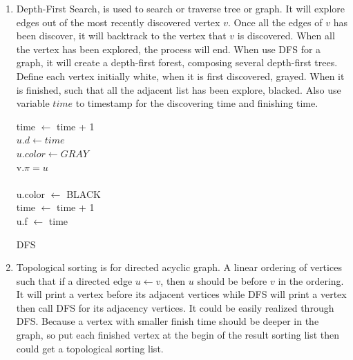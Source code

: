 \documentclass{assignment}
\begin{document}
    \maketitle

    \newpage
\begin{homeworkProblem}

\begin{enumerate}
\item Depth-First Search, is used to search or traverse tree or graph. It will explore edges out of the most recently discovered vertex $v$. Once all the edges of $v$ has been discover, it will backtrack to the vertex that $v$ is discovered. When all the vertex has been explored, the process will end. When use DFS for a graph, it will create a depth-first forest, composing several depth-first trees. Define each vertex initially white, when it is first discovered, grayed. When it is finished, such that all the adjacent list has been explore, blacked. Also use variable $time$ to timestamp for the discovering time and finishing time.


  \begin{algorithm}[H]
 \BlankLine
{}
 {
	time $\leftarrow$ time + 1 \\
	$u.d \leftarrow time$ \\
	$u.color \leftarrow GRAY$ \\
	 {
		 {
		v.$\pi = u$ \\
			 \\		
		}
	}
	u.color $\leftarrow$ BLACK \\
	time $\leftarrow$ time + 1\\
	u.f $\leftarrow$ time \\
}	
	
	
\caption{DFS} \end{algorithm}


\item Topological sorting is for directed acyclic graph. A linear ordering of vertices such that if a directed edge $u \leftarrow v$, then $u$ should be before $v$ in the ordering. It will print a vertex before its adjacent vertices while DFS will print a vertex then call DFS for its adjacency vertices. It could be easily realized through DFS. Because a vertex with smaller finish time should be deeper in the graph, so put each finished vertex at the begin of the result sorting list then could get a topological sorting list. 


\end{enumerate}
\end{homeworkProblem}
\end{document}
